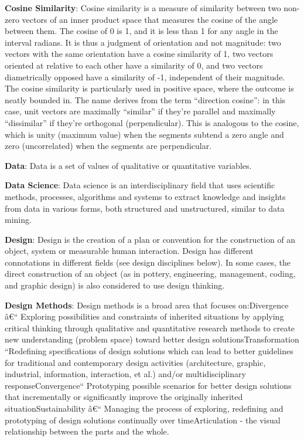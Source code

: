 \documentclass[]{book}
\newcommand{\euro}{€}
\theoremstyle{definition}
\theoremstyle{definition}
\theoremstyle{definition}
\theoremstyle{remark}
\begin{document}
\textbf{Cosine Similarity}: Cosine similarity is a measure of similarity
between two non-zero vectors of an inner product space that measures the
cosine of the angle between them. The cosine of 0 is 1, and it is less
than 1 for any angle in the interval radians. It is thus a judgment of
orientation and not magnitude: two vectors with the same orientation
have a cosine similarity of 1, two vectors oriented at relative to each
other have a similarity of 0, and two vectors diametrically opposed have
a similarity of -1, independent of their magnitude. The cosine
similarity is particularly used in positive space, where the outcome is
neatly bounded in. The name derives from the term ``direction cosine'':
in this case, unit vectors are maximally ``similar'' if they're parallel
and maximally ``dissimilar'' if they're orthogonal (perpendicular). This
is analogous to the cosine, which is unity (maximum value) when the
segments subtend a zero angle and zero (uncorrelated) when the segments
are perpendicular.

\textbf{Data}: Data is a set of values of qualitative or quantitative
variables.

\textbf{Data Science}: Data science is an interdisciplinary field that
uses scientific methods, processes, algorithms and systems to extract
knowledge and insights from data in various forms, both structured and
unstructured, similar to data mining.

\textbf{Design}: Design is the creation of a plan or convention for the
construction of an object, system or measurable human interaction.
Design has different connotations in different fields (see design
disciplines below). In some cases, the direct construction of an object
(as in pottery, engineering, management, coding, and graphic design) is
also considered to use design thinking.

\textbf{Design Methods}: Design methods is a broad area that focuses
on:Divergence â\euro{}`` Exploring possibilities and constraints of
inherited situations by applying critical thinking through qualitative
and quantitative research methods to create new understanding (problem
space) toward better design solutionsTransformation ``Redefining
specifications of design solutions which can lead to better guidelines
for traditional and contemporary design activities (architecture,
graphic, industrial, information, interaction, et al.) and/or
multidisciplinary responseConvergence`` Prototyping possible scenarios
for better design solutions that incrementally or significantly improve
the originally inherited situationSustainability â\euro{}`` Managing the
process of exploring, redefining and prototyping of design solutions
continually over timeArticulation - the visual relationship between the
parts and the whole.
\end{document}
